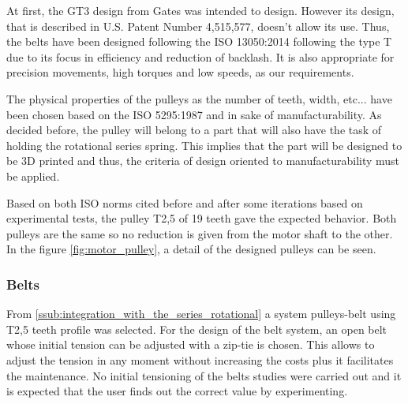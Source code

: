 At first, the GT3 design from Gates was intended to design.
However its design, that is described in U.S. Patent Number 4,515,577, doesn't allow its use.
Thus, the belts have been designed following the ISO 13050:2014 \cite{ISO13050} following the type T due to its focus in efficiency and reduction of backlash.
It is also appropriate for precision movements, high torques and low speeds, as our requirements.

The physical properties of the pulleys as the number of teeth, width, etc... have been chosen based on the ISO 5295:1987 \cite{ISO5295} and in sake of manufacturability.
As decided before, the pulley will belong to a part that will also have the task of holding the rotational series spring.
This implies that the part will be designed to be 3D printed and thus, the criteria of design oriented to manufacturability must be applied.

Based on both ISO norms cited before and after some iterations based on experimental tests, the pulley T2,5 of 19 teeth gave the expected behavior.
Both pulleys are the same so no reduction is given from the motor shaft to the other.
In the figure \ref{fig:motor_pulley}, a detail of the designed pulleys can be seen.

\subsubsection{Belts} %
\label{ssub:belts}
From \ref{ssub:integration_with_the_series_rotational} a system pulleys-belt using T2,5 teeth profile was selected.
For the design of the belt system, an open belt whose initial tension can be adjusted with a zip-tie is chosen.
This allows to adjust the tension in any moment without increasing the costs plus it facilitates the maintenance.
No initial tensioning of the belts studies were carried out and it is expected that the user finds out the correct value by experimenting.

